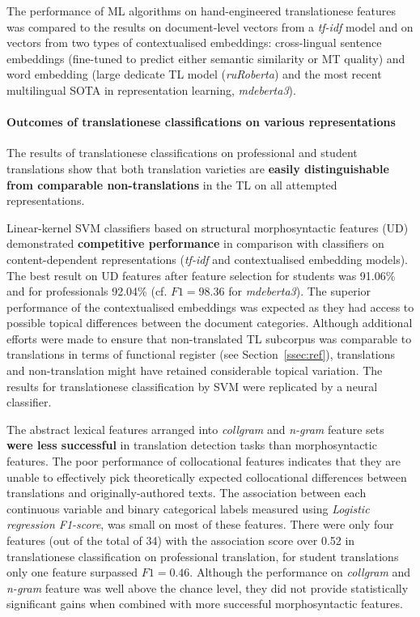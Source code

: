 The performance of ML algorithms on hand-engineered translationese features was compared to the results on document-level vectors from a \textit{tf-idf} model and on vectors from two types of contextualised embeddings: cross-lingual sentence embeddings (fine-tuned to predict either semantic similarity or MT quality) and word embedding (large dedicate TL model (\textit{ruRoberta}) and the most recent multilingual SOTA in representation learning, \textit{mdeberta3}). 

\paragraph{Outcomes of translationese classifications on various representations} 
The results of translationese classifications on professional and student translations show that both translation varieties are \textbf{easily distinguishable from comparable non-translations} in the TL on all attempted representations. 

Linear-kernel SVM classifiers based on structural morphosyntactic features (UD) demonstrated \textbf{competitive performance} in comparison with classifiers on content-dependent representations (\textit{tf-idf} and contextualised embedding models). 
The best result on UD features after feature selection for students was 91.06\% and for professionals 92.04\% (cf. $F1=98.36$ for \textit{mdeberta3}).
The superior performance of the contextualised embeddings was expected as they had access to possible topical differences between the document categories. Although additional efforts were made to ensure that non-translated TL subcorpus was comparable to translations in terms of functional register (see Section~\ref{ssec:ref}), translations and non-translation might have retained considerable topical variation. The results for translationese classification by SVM were replicated by a neural classifier.

The abstract lexical features arranged into \textit{collgram} and \textit{n-gram} feature sets \textbf{were less successful} in translation detection tasks than morphosyntactic features. 
The poor performance of collocational features indicates that they are unable to effectively pick theoretically expected collocational differences between translations and originally-authored texts. The association between each continuous variable and binary categorical labels measured using \textit{Logistic regression F1-score}, was small on most of these features. There were only four features (out of the total of 34) with the association score over 0.52 in translationese classification on professional translation, for student translations only one feature surpassed $F1=0.46$. Although the performance on \textit{collgram} and \textit{n-gram} feature was well above the chance level, they did not provide statistically significant gains when combined with more successful morphosyntactic features. 

